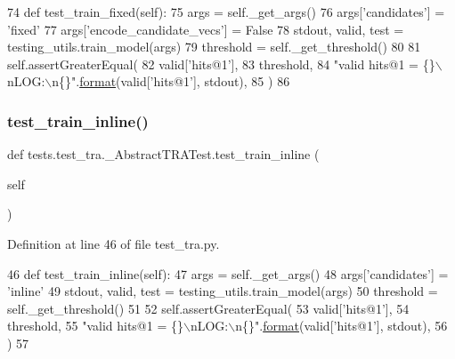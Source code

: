 \begin{DoxyCode}
74     \textcolor{keyword}{def }test\_train\_fixed(self):
75         args = self.\_get\_args()
76         args[\textcolor{stringliteral}{'candidates'}] = \textcolor{stringliteral}{'fixed'}
77         args[\textcolor{stringliteral}{'encode\_candidate\_vecs'}] = \textcolor{keyword}{False}
78         stdout, valid, test = testing\_utils.train\_model(args)
79         threshold = self.\_get\_threshold()
80 
81         self.assertGreaterEqual(
82             valid[\textcolor{stringliteral}{'hits@1'}],
83             threshold,
84             \textcolor{stringliteral}{"valid hits@1 = \{\}\(\backslash\)nLOG:\(\backslash\)n\{\}"}.\hyperlink{namespaceparlai_1_1chat__service_1_1services_1_1messenger_1_1shared__utils_a32e2e2022b824fbaf80c747160b52a76}{format}(valid[\textcolor{stringliteral}{'hits@1'}], stdout),
85         )
86 
\end{DoxyCode}
\mbox{\label{classtests_1_1test__tra_1_1__AbstractTRATest_a8f1fa4ff06f7fd52c1639655561fe7ee}} 
\subsubsection{\texorpdfstring{test\+\_\+train\+\_\+inline()}{test\_train\_inline()}}
{\footnotesize\ttfamily def tests.\+test\+\_\+tra.\+\_\+\+Abstract\+T\+R\+A\+Test.\+test\+\_\+train\+\_\+inline (\begin{DoxyParamCaption}\item[{}]{self }\end{DoxyParamCaption})}



Definition at line 46 of file test\+\_\+tra.\+py.


\begin{DoxyCode}
46     \textcolor{keyword}{def }test\_train\_inline(self):
47         args = self.\_get\_args()
48         args[\textcolor{stringliteral}{'candidates'}] = \textcolor{stringliteral}{'inline'}
49         stdout, valid, test = testing\_utils.train\_model(args)
50         threshold = self.\_get\_threshold()
51 
52         self.assertGreaterEqual(
53             valid[\textcolor{stringliteral}{'hits@1'}],
54             threshold,
55             \textcolor{stringliteral}{"valid hits@1 = \{\}\(\backslash\)nLOG:\(\backslash\)n\{\}"}.\hyperlink{namespaceparlai_1_1chat__service_1_1services_1_1messenger_1_1shared__utils_a32e2e2022b824fbaf80c747160b52a76}{format}(valid[\textcolor{stringliteral}{'hits@1'}], stdout),
56         )
57 
\end{DoxyCode}


